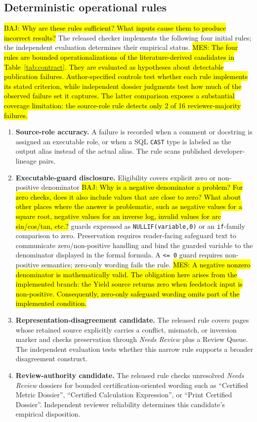 \documentclass[a4paper,fleqn]{cas-dc}
\newcommand{\baj}[1]{{\sethlcolor{yellow}\hl{BAJ: #1}}}
\newcommand{\mes}[1]{{\sethlcolor{orange}\hl{MES: #1}}}
\begin{document}
\subsection{Deterministic operational rules}
\baj{Why are these rules sufficient? What inputs cause them to produce incorrect results?}
The released checker implements the following four initial rules; the independent evaluation determines their empirical status.
\mes{The four rules are bounded operationalizations of the literature-derived candidates in Table~\ref{tab:contract}. They are evaluated as hypotheses about detectable publication failures. Author-specified controls test whether each rule implements its stated criterion, while independent dossier judgments test how much of the observed failure set it captures. The latter comparison exposes a substantial coverage limitation: the source-role rule detects only 2 of 16 reviewer-majority failures.}
\begin{enumerate}[leftmargin=*]
\item \textbf{Source-role accuracy.} A failure is recorded when a comment or docstring is assigned an executable role, or when a SQL \texttt{CAST} type is labeled as the output alias instead of the actual alias. The rule scans published developer-lineage pairs.
\item \textbf{Executable-guard disclosure.} Eligibility covers explicit zero or non-positive denominator \baj{Why is a negative denominator a problem? For zero checks, does it also include values that are close to zero? What about other places where the answer is problematic, such as negative values for a square root, negative values for an inverse log, invalid values for arc sin/cos/tan, etc.?} guards expressed as \texttt{NULLIF(variable,0)} or an \texttt{if}-family comparison to zero. Preservation requires reader-facing safeguard text to communicate zero/non-positive handling and bind the guarded variable to the denominator displayed in the formal formula. A \texttt{<= 0} guard requires non-positive semantics; zero-only wording fails the rule.
\mes{A negative nonzero denominator is mathematically valid. The obligation here arises from the implemented branch: the Yield source returns zero when feedstock input is non-positive. Consequently, zero-only safeguard wording omits part of the implemented condition.}
\item \textbf{Representation-disagreement candidate.} The released rule covers pages whose retained source explicitly carries a conflict, mismatch, or inversion marker and checks preservation through \emph{Needs Review} plus a Review Queue. The independent evaluation tests whether this narrow rule supports a broader disagreement construct.
\item \textbf{Review-authority candidate.} The released rule checks unresolved \emph{Needs Review} dossiers for bounded certification-oriented wording such as ``Certified Metric Dossier'', ``Certified Calculation Expression'', or ``Print Certified Dossier''. Independent reviewer reliability determines this candidate's empirical disposition.
\end{enumerate}
\end{document}
